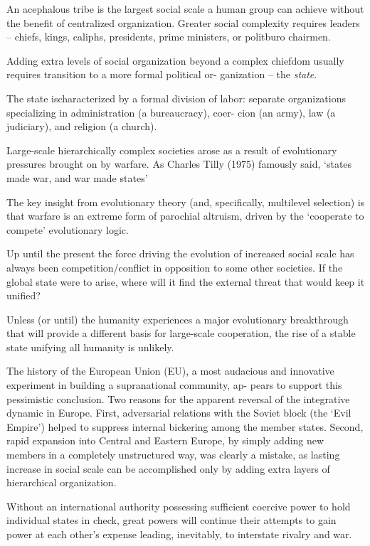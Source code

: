 \documentclass[
]{book}
\begin{document}
An acephalous tribe is the largest social scale a human
group can achieve without the benefit of centralized organization.
Greater social complexity requires leaders -- chiefs, kings, caliphs,
presidents, prime ministers, or politburo chairmen.

Adding extra levels of social organization beyond a complex
chiefdom usually requires transition to a more formal political or-
ganization -- the \emph{state}.

The state ischaracterized by a formal division of labor:
separate organizations specializing in administration (a bureaucracy), coer-
cion (an army), law (a judiciary), and religion (a church).

Large-scale hierarchically
complex societies arose as a result of evolutionary pressures
brought on by warfare. As Charles Tilly (1975) famously said,
`states made war, and war made states'

The key insight from evolutionary theory
(and, specifically, multilevel selection) is that warfare is
an extreme form of parochial altruism, driven by the `cooperate to
compete' evolutionary logic.

Up until the present the force
driving the evolution of increased social scale has always been
competition/conflict in opposition to some other societies. If the
global state were to arise, where will it find the external threat that
would keep it unified?

Unless (or until) the humanity experiences a major evolutionary breakthrough
that will provide a different basis for large-scale cooperation,
the rise of a stable state unifying all humanity is unlikely.

The history of the European Union (EU), a most audacious and
innovative experiment in building a supranational community, ap-
pears to support this pessimistic conclusion.
Two reasons for the apparent
reversal of the integrative dynamic in Europe. First, adversarial
relations with the Soviet block (the `Evil Empire') helped to suppress internal
bickering among the member states.
Second, rapid expansion into Central and Eastern Europe,
by simply adding new members in a completely unstructured way,
was clearly a mistake,
as lasting increase in social scale can be accomplished only by
adding extra layers of hierarchical organization.

Without an international authority possessing sufficient coercive power to hold
individual states in check, great powers will continue their attempts
to gain power at each other's expense leading, inevitably, to
interstate rivalry and war.
\end{document}
